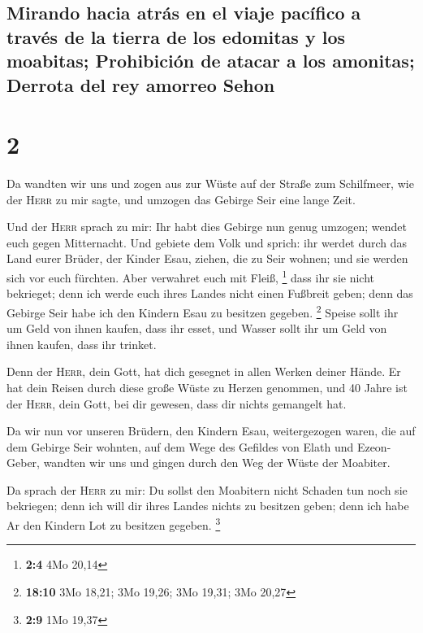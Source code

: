\hypertarget{mirando-hacia-atruxe1s-en-el-viaje-pacuxedfico-a-travuxe9s-de-la-tierra-de-los-edomitas-y-los-moabitas-prohibiciuxf3n-de-atacar-a-los-amonitas-derrota-del-rey-amorreo-sehon}{%
\subsection{Mirando hacia atrás en el viaje pacífico a través de la
tierra de los edomitas y los moabitas; Prohibición de atacar a los
amonitas; Derrota del rey amorreo
Sehon}\label{mirando-hacia-atruxe1s-en-el-viaje-pacuxedfico-a-travuxe9s-de-la-tierra-de-los-edomitas-y-los-moabitas-prohibiciuxf3n-de-atacar-a-los-amonitas-derrota-del-rey-amorreo-sehon}}

\hypertarget{section-1}{%
\section{2}\label{section-1}}

 Da wandten wir uns und zogen aus zur Wüste auf der Straße
zum Schilfmeer, wie der \textsc{Herr} zu mir sagte, und umzogen das
Gebirge Seir eine lange Zeit.

 Und der \textsc{Herr} sprach zu mir:  Ihr
habt dies Gebirge nun genug umzogen; wendet euch gegen Mitternacht.
 Und gebiete dem Volk und sprich: ihr werdet durch das
Land eurer Brüder, der Kinder Esau, ziehen, die zu Seir wohnen; und sie
werden sich vor euch fürchten. Aber verwahret euch mit Fleiß,
\footnote{\textbf{2:4} 4Mo 20,14}  dass ihr sie nicht
bekrieget; denn ich werde euch ihres Landes nicht einen Fußbreit geben;
denn das Gebirge Seir habe ich den Kindern Esau zu besitzen gegeben.
\footnote{\textbf{18:10} 3Mo 18,21; 3Mo 19,26; 3Mo 19,31; 3Mo 20,27}
 Speise sollt ihr um Geld von ihnen kaufen, dass ihr
esset, und Wasser sollt ihr um Geld von ihnen kaufen, dass ihr trinket.

 Denn der \textsc{Herr}, dein Gott, hat dich gesegnet in
allen Werken deiner Hände. Er hat dein Reisen durch diese große Wüste zu
Herzen genommen, und 40 Jahre ist der \textsc{Herr}, dein Gott, bei dir
gewesen, dass dir nichts gemangelt hat.

 Da wir nun vor unseren Brüdern, den Kindern Esau,
weitergezogen waren, die auf dem Gebirge Seir wohnten, auf dem Wege des
Gefildes von Elath und Ezeon-Geber, wandten wir uns und gingen durch den
Weg der Wüste der Moabiter.

 Da sprach der \textsc{Herr} zu mir: Du sollst den
Moabitern nicht Schaden tun noch sie bekriegen; denn ich will dir ihres
Landes nichts zu besitzen geben; denn ich habe Ar den Kindern Lot zu
besitzen gegeben. \footnote{\textbf{2:9} 1Mo 19,37}

